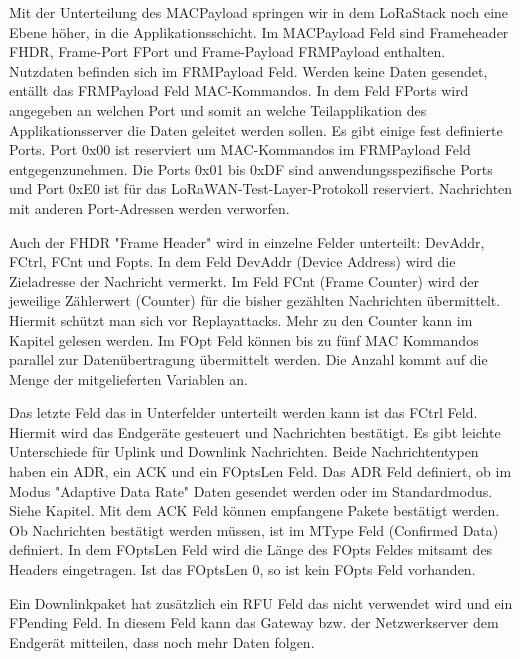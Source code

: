 \documentclass[a4paper,12pt]{article}
\begin{document}
                Mit der Unterteilung des MACPayload springen wir in dem LoRaStack noch eine Ebene höher, in die 
                Applikationsschicht. Im MACPayload Feld sind Frameheader FHDR, Frame-Port FPort und 
                Frame-Payload FRMPayload enthalten. Nutzdaten befinden sich im FRMPayload Feld. Werden keine
                Daten gesendet, entällt das FRMPayload Feld MAC-Kommandos. In dem Feld FPorts wird 
                angegeben an welchen Port und somit an welche Teilapplikation des Applikationsserver die Daten geleitet 
                werden sollen. Es gibt einige fest definierte Ports. Port 0x00 ist reserviert um MAC-Kommandos im FRMPayload Feld 
                entgegenzunehmen. Die Ports 0x01 bis 0xDF sind anwendungsspezifische Ports und Port 0xE0 ist für das 
                LoRaWAN-Test-Layer-Protokoll reserviert. Nachrichten mit anderen Port-Adressen werden verworfen. 

                Auch der FHDR "Frame Header" wird in einzelne Felder unterteilt: DevAddr, FCtrl, FCnt und Fopts. 
                In dem Feld DevAddr (Device Address) wird die Zieladresse der Nachricht vermerkt. Im Feld FCnt 
                (Frame Counter) wird der 
                jeweilige Zählerwert (Counter) für die bisher gezählten Nachrichten übermittelt. Hiermit schützt man sich vor 
                Replayattacks. Mehr zu den Counter kann im Kapitel  gelesen werden. Im FOpt Feld 
                können bis zu fünf MAC Kommandos parallel zur Datenübertragung übermittelt werden. Die Anzahl kommt auf die Menge der 
                mitgelieferten Variablen an. 

                Das letzte Feld das in Unterfelder unterteilt werden kann ist das FCtrl Feld. Hiermit wird das Endgeräte 
                gesteuert und Nachrichten bestätigt. Es gibt leichte Unterschiede für Uplink und Downlink 
                Nachrichten. Beide Nachrichtentypen haben ein ADR, ein ACK und ein FOptsLen Feld. Das ADR Feld definiert, 
                ob im Modus "Adaptive Data Rate" Daten gesendet werden oder im Standardmodus. Siehe Kapitel. 
                Mit dem ACK Feld können empfangene Pakete bestätigt werden. Ob Nachrichten bestätigt werden müssen,
                ist im MType Feld (Confirmed Data) definiert. In dem FOptsLen Feld wird die Länge des FOpts Feldes mitsamt des 
                Headers eingetragen. Ist das FOptsLen 0, so ist kein FOpts Feld vorhanden.

                Ein Downlinkpaket hat zusätzlich ein RFU Feld das nicht verwendet wird und ein FPending Feld. In diesem 
                Feld kann das Gateway bzw. der Netzwerkserver dem Endgerät mitteilen, dass noch mehr Daten folgen.
\end{document}
